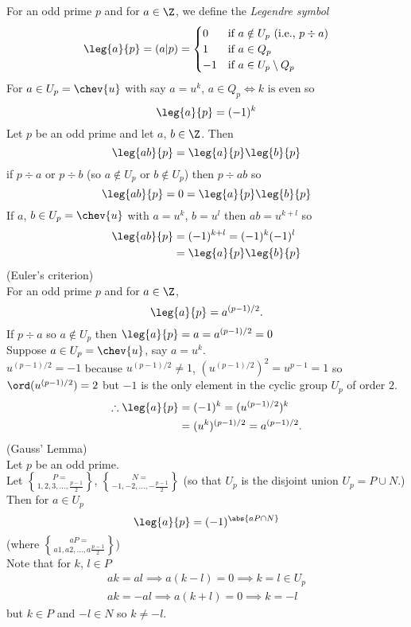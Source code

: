 For an odd prime $p$ and for $a\in\Z$, we define the \emph{Legendre symbol}
\[ \leg{a}{p} = (a|p) = \begin{cases}
0 & \text{if $a\notin U_p$ (i.e., $p\div a$)} \\
1 & \text{if $a\in Q_p$} \\
-1 & \text{if $a\in U_p\setminus Q_p$}
\end{cases} \]
\note For $a\in U_p=\chev{u}$ with say $a=u^k$, $a\in Q_p\iff\text{$k$ is even}$ so
\[ \leg{a}{p} = (-1)^k \]
\thm Let $p$ be an odd prime and let $a$, $b\in\Z$.  Then
\[ \leg{ab}{p} = \leg{a}{p}\leg{b}{p} \]
\pf if $p\div a$ or $p\div b$ (so $a\notin U_p$ or $b\notin U_p$) then $p\div ab$ so
\[ \leg{ab}{p} = 0 = \leg{a}{p} \leg{b}{p} \]
If $a$, $b\in U_p=\chev{u}$ with $a=u^k$, $b=u^l$ then $ab=u^{k+l}$ so
\begin{align*}
\leg{ab}{p} &= (-1)^{k+l} = (-1)^k (-1)^l \\
&= \leg{a}{p} \leg{b}{p}
\end{align*}
\thm (Euler's criterion) \\
For an odd prime $p$ and for $a\in\Z$,
\[ \leg{a}{p}  = a^{(p-1)/2} . \]
\pf If $p\div a$ so $a\notin U_p$ then $\leg{a}{p}=a=a^{(p-1)/2}=0$ \\
Suppose $a\in U_p=\chev{u}$, say $a=u^k$. \\
\note $u^{(p-1)/2}=-1$ because $u^{(p-1)/2}\neq1$, $(u^{(p-1)/2})^2=u^{p-1}=1$ so $\ord(u^{(p-1)/2})=2$ but $-1$ is the only element in the cyclic group $U_p$ of order $2$.
\begin{align*}
\therefore \leg{a}{p} &= (-1)^k = (u^{(p-1)/2})^k \\
&= (u^k)^{(p-1)/2} = a^{(p-1)/2} .
\end{align*}
\thm (Gauss' Lemma) \\
Let $p$ be an odd prime. \\
Let $P=\brace{1,2,3,\dotsc,\frac{p-1}{2}}$, $N=\brace{-1,-2,\dotsc,-\frac{p-1}{2}}$ (so that $U_p$ is the disjoint union $U_p=P\cup N$.) \\
Then for $a\in U_p$
\[ \leg{a}{p} = (-1)^{\abs{aP\cap N}} \]
(where $aP=\brace{a1,a2,\dotsc,a\frac{p-1}{2}}$) \\
\pf Note that for $k$, $l\in P$
\begin{gather*}
ak = al \implies a(k-l) = 0 \implies k = l \in U_p \\
ak = -al \implies a(k+l) = 0 \implies k = -l
\end{gather*}
but $k\in P$ and $-l\in N$ so $k\neq-l$. \\
